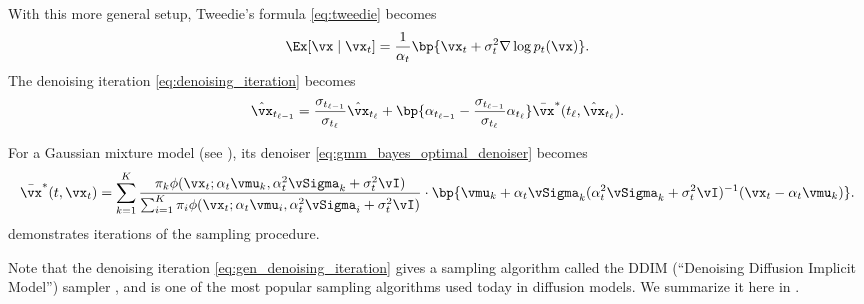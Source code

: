 \documentclass[../../book-main.tex]{subfiles}
\begin{document}
With this more general setup, Tweedie's formula \eqref{eq:tweedie} becomes 
\begin{equation}\label{eq:gen_tweedie}
	\Ex[\vx \mid \vx_{t}] = \frac{1}{\alpha_{t}}\bp{\vx_{t} + \sigma_{t}^{2}\nabla \log p_{t}(\vx)}.
\end{equation}
The denoising iteration \eqref{eq:denoising_iteration} becomes
\begin{equation}\label{eq:gen_denoising_iteration}
	\hat{\vx}_{t_{\ell - 1}} = \frac{\sigma_{t_{\ell - 1}}}{\sigma_{t_{\ell}}}\hat{\vx}_{t_{\ell}} + \bp{\alpha_{t_{\ell - 1}} - \frac{\sigma_{t_{\ell - 1}}}{\sigma_{t_{\ell}}}\alpha_{t_{\ell}}}\bar{\vx}^{\ast}(t_{\ell}, \hat{\vx}_{t_{\ell}}).
\end{equation}

\begin{example} 
	For a Gaussian mixture model (see ), its denoiser \eqref{eq:gmm_bayes_optimal_denoiser} becomes 
	\begin{equation}\label{eq:gen_gmm_bayes_optimal_denoiser}
		\bar{\vx}^{\ast}(t, \vx_{t}) = \sum_{k = 1}^{K}\frac{\pi_{k}\phi(\vx_{t}
		; \alpha_{t}\vmu_{k}, \alpha_{t}^{2}\vSigma_{k}
		+ \sigma_{t}^{2}\vI)}{\sum_{i = 1}^{K}\pi_{i}\phi(\vx_{t} ; \alpha_{t}\vmu_{i}, \alpha_{t}^{2}\vSigma_{i} + \sigma_{t}^{2}\vI)}\cdot\bp{\vmu_{k} + \alpha_{t}\vSigma_{k}(\alpha_{t}^{2}\vSigma_{k} + \sigma_{t}^{2}\vI)^{-1}(\vx_{t} - \alpha_{t}\vmu_{k})}.
	\end{equation}
	 demonstrates iterations of the sampling procedure. 
\end{example}

Note that the denoising iteration \eqref{eq:gen_denoising_iteration} gives a sampling algorithm called the DDIM (``Denoising Diffusion Implicit Model'') sampler \cite{song2020denoising}, and is one of the most popular sampling algorithms used today in diffusion models. We summarize it here in .
\end{document}
